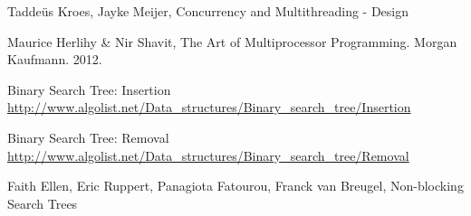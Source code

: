 \documentclass[a4paper]{article}
\begin{document}
\begin{thebibliography}{}    
    Taddeüs Kroes, Jayke Meijer, Concurrency and Multithreading - Design

    Maurice Herlihy \& Nir Shavit, The Art of Multiprocessor Programming. Morgan Kaufmann.         
    2012.

    Binary Search Tree: Insertion
    \url{http://www.algolist.net/Data_structures/Binary_search_tree/Insertion}
    
    Binary Search Tree: Removal
    \url{http://www.algolist.net/Data_structures/Binary_search_tree/Removal}

    Faith Ellen, Eric Ruppert, Panagiota Fatourou, Franck van Breugel, Non-blocking Search 
    Trees

\end{thebibliography}
\end{document}
